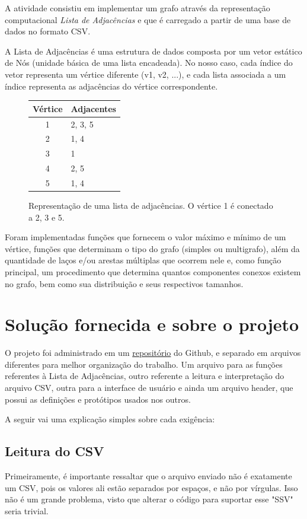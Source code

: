 \documentclass[a4paper, 12pt]{article}
\begin{document}
A atividade consistiu em implementar um grafo através da representação computacional
\textit{Lista de Adjacências} e que é carregado a partir de uma base de dados no
formato CSV.

A Lista de Adjacências é uma estrutura de dados composta por um vetor estático
de Nós (unidade básica de uma lista encadeada). No nosso caso, cada índice do
vetor representa um vértice diferente (v1, v2, ...), e cada lista associada a um
índice representa as adjacências do vértice correspondente.

\begin{figure}[h]
\centering
\begin{tabular}{c|l}
Vértice & Adjacentes \\ \hline
1 & 2, 3, 5 \\
2 & 1, 4 \\
3 & 1 \\
4 & 2, 5 \\
5 & 1, 4 \\
\end{tabular}
\caption{Representação de uma lista de adjacências. O vértice 1 é
conectado a 2, 3 e 5.}
\end{figure}

Foram implementadas funções que fornecem o valor máximo e mínimo de um vértice,
funções que determinam o tipo do grafo (simples ou multigrafo), além da quantidade
de laços e/ou arestas múltiplas que ocorrem nele e, como função principal, um
procedimento que determina quantos componentes conexos existem no grafo, bem como
sua distribuição e seus respectivos tamanhos.

\newpage
\section{Solução fornecida e sobre o projeto}

O projeto foi administrado em um \href{https://github.com/atomicpenguinz/TEG_1}{repositório}
do Github, e separado em arquivos diferentes para melhor organização do trabalho.
Um arquivo para as funções referentes à Lista de Adjacências, outro referente
a leitura e interpretação do arquivo CSV, outra para a interface de usuário e ainda
um arquivo header, que possui as definições e protótipos usados nos outros.

A seguir vai uma explicação simples sobre cada exigência:

\subsection{Leitura do CSV}
Primeiramente, é importante ressaltar que o arquivo enviado não é exatamente um
CSV, pois os valores ali estão separados por espaços, e não por vírgulas. Isso
não é um grande problema, visto que alterar o código para suportar esse "SSV"
seria trivial.
\end{document}
